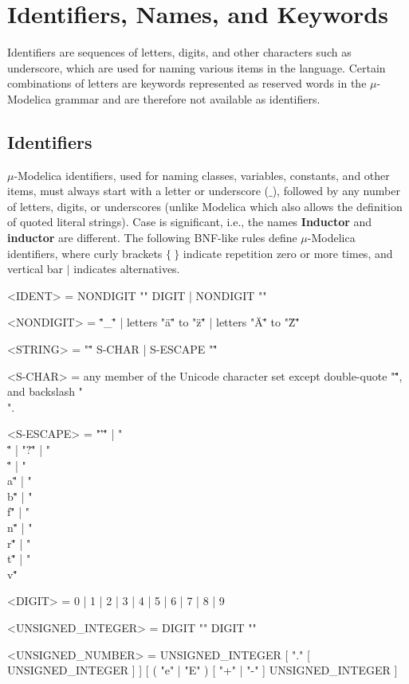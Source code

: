 \documentclass[11pt,a4paper,notitlepage]{report}
\begin{document}
\section{Identifiers, Names, and Keywords}

Identifiers are sequences of letters, digits, and other characters such as underscore, which are used for naming various items in the language. Certain combinations of letters are keywords represented as reserved words in the $\mu$-Modelica grammar and are therefore not available as identifiers.

\subsection{Identifiers}

$\mu$-Modelica identifiers, used for naming classes, variables, constants, and other items, must always start with a letter or underscore ($\_$), followed by any number of letters, digits, or underscores (unlike Modelica which also allows the definition of quoted literal strings). Case is
significant, i.e., the names \textbf{Inductor} and \textbf{inductor} are different. The following BNF-like rules define $\mu$-Modelica identifiers, where curly brackets $\{\ \}$ indicate repetition zero or more times, and vertical bar $|$ indicates alternatives.

\begin{grammar}\scriptsize

<IDENT> = NONDIGIT "{" DIGIT | NONDIGIT "}" 

<NONDIGIT> = "\"_\"" | letters "\"a\"" to "\"z\"" | letters "\"A\"" to "\"Z\""

<STRING> = "\"" { S-CHAR | S-ESCAPE } "\""

<S-CHAR> = any member of the Unicode character set except double-quote "\"\"\"", and backslash "\\".  

<S-ESCAPE> = "\"’\"" | "\\\"" | "\"?\"" | "\"\\\"" |
"\"\\a\"" | "\"\\b\"" | "\"\\f\"" | "\"\\n\"" | "\"\\r\"" | "\"\\t\"" | "\"\\v\""

<DIGIT> = 0 | 1 | 2 | 3 | 4 | 5 | 6 | 7 | 8 | 9

<UNSIGNED_INTEGER> = DIGIT "{" DIGIT "}"

<UNSIGNED_NUMBER> = UNSIGNED_INTEGER [ "." [ UNSIGNED_INTEGER ] ] [ ( "e" | "E" ) [ "+" | "-" ] UNSIGNED_INTEGER ]

\end{grammar}
\end{document}
